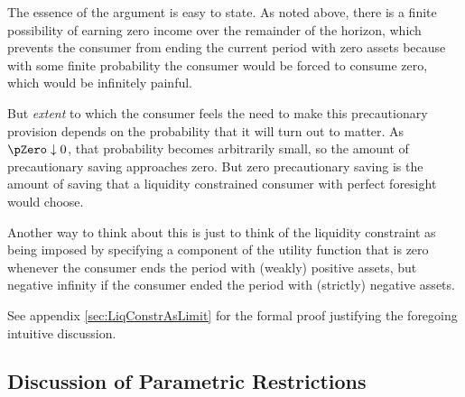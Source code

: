 \documentclass[./BufferStockTheory.tex]{subfiles}
\begin{document}
The essence of the argument is easy to state.  As noted above, there is a finite possibility of earning zero income over the remainder of the horizon, which prevents
the consumer from ending the current period with zero assets because
with some finite probability the consumer would be forced to consume zero,
which would be infinitely painful.

But \textit{extent} to which the consumer feels the need to make this
precautionary provision depends on the probability that it will turn
out to matter.  As $\pZero \downarrow 0$, that probability becomes
arbitrarily small, so the amount of precautionary saving approaches zero.
But zero precautionary saving is the amount of saving that a liquidity
constrained consumer with perfect foresight would choose.

Another way to think about this is just to think of the liquidity
constraint as being imposed by specifying a component of the utility
function that is zero whenever the consumer ends the period with
(weakly) positive assets, but negative infinity if the consumer
ended the period with (strictly) negative assets.

See appendix \ref{sec:LiqConstrAsLimit} for the formal proof justifying the
foregoing intuitive discussion.

\hypertarget{Discussion-of-Parametric-Restrictions}{}
\subsection{Discussion of Parametric Restrictions}\label{sec:discussConvergence}
\end{document}
